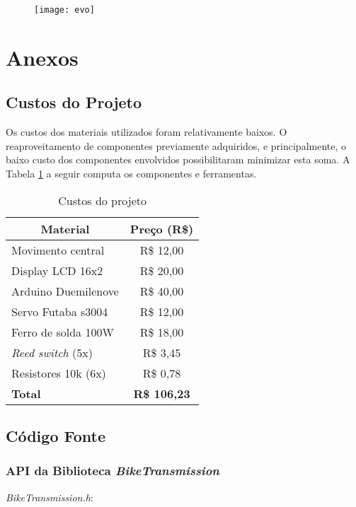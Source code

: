 \documentclass[a4paper,11pt]{article}
\begin{document}
\begin{figure}[h!]
\begin{center}
 \texttt{[image: evo]}
\end{center}
\end{figure}


\pagebreak
%
\section{Anexos}
\label{sec:anexos}

%

%
\subsection{Custos do Projeto}
\label{custos}
Os custos dos materiais utilizados foram relativamente baixos. O
reaproveitamento de componentes previamente adquiridos, e principalmente, o
baixo custo dos componentes envolvidos possibilitaram minimizar esta soma. A
Tabela \ref{tab:custos} a seguir computa os componentes e ferramentas.
{
\newcommand{\mc}[3]{\multicolumn{#1}{#2}{#3}}
\begin{table}[ht]
\begin{center}
\caption{Custos do projeto}
\label{tab:custos}
\begin{tabular}{lc}
\mc{1}{c}{\textbf{Material}} & \textbf{Preço (R\$)}\\\hline
Movimento central & R\$ 12,00\\
Display LCD 16x2 & R\$ 20,00\\
Arduino Duemilenove & R\$ 40,00\\
Servo Futaba s3004 & R\$ 12,00\\
Ferro de solda 100W & R\$ 18,00\\
\textit{Reed switch} (5x) & R\$ 3,45\\
Resistores 10k (6x) & R\$ 0,78\\\hline
\textbf{Total} & \textbf{R\$ 106,23}\\\hline
\end{tabular}
\end{center}
\end{table}
}



%
\subsection{Código Fonte}
\label{codigo}

\subsubsection{API da Biblioteca \textit{BikeTransmission}}
\label{code:api}
\textit{BikeTransmission.h}:

\end{document}
